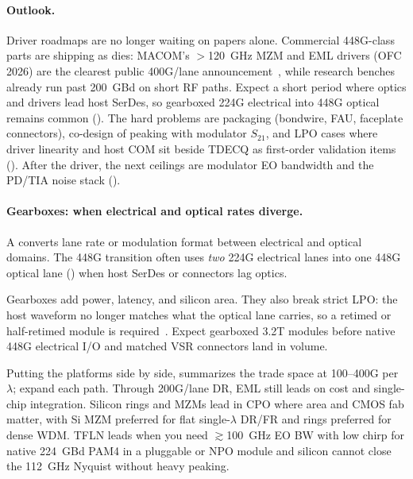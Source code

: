 \paragraph{Outlook.}
Driver roadmaps are no longer waiting on papers alone. Commercial 448G-class
parts are shipping as dies: MACOM's $>$120~GHz MZM and EML drivers (OFC 2026) are
the clearest public 400G/lane announcement~, while
research benches already run past 200~GBd on short RF paths. Expect a short
period where optics and drivers lead host SerDes, so gearboxed 224G electrical
into 448G optical remains common (). The hard problems
are packaging (bondwire, FAU, faceplate connectors), co-design of peaking with
modulator $S_{21}$, and LPO cases where driver linearity and host COM sit beside
TDECQ as first-order validation items (). After
the driver, the next ceilings are modulator EO bandwidth and the PD/TIA noise
stack ().


\paragraph{Gearboxes: when electrical and optical rates diverge.}
\label{sec:gearbox}

A  converts lane rate or modulation format between
electrical and optical domains. The 448G transition often uses \emph{two} 224G
electrical lanes into one 448G optical lane () when
host SerDes or connectors lag optics.

Gearboxes add power, latency, and silicon area. They also break strict LPO: the host
waveform no longer matches what the optical lane carries, so a retimed or
half-retimed module is required~. Expect gearboxed 3.2T modules
before native 448G electrical I/O and matched VSR connectors land in volume.

Putting the platforms side by side,  summarizes the trade
space at 100--400G per $\lambda$; 
expand each path. Through 200G/lane DR, EML still leads on cost and single-chip
integration. Silicon rings and MZMs lead in CPO where area and CMOS fab matter,
with Si MZM preferred for flat single-$\lambda$ DR/FR and rings preferred for dense
WDM. TFLN leads when you need $\gtrsim$100~GHz EO BW with low chirp for native
224~GBd PAM4 in a pluggable or NPO module and silicon cannot close the 112~GHz
Nyquist without heavy peaking.

